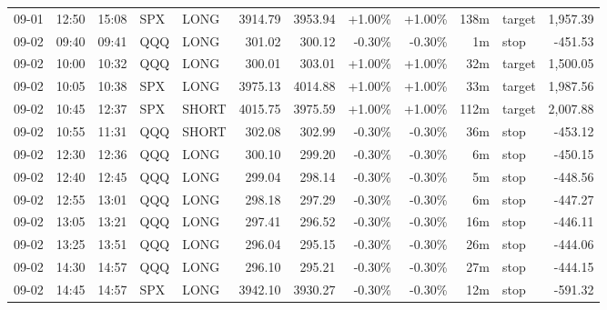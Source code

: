 \documentclass[11pt,a4paper]{article}
\begin{document}
\begin{center}
\begin{longtable}{>{\color{txtmain}}l l l l l r r r r r >{\color{txtmain}}l r}
09-01 & 12:50 & 15:08 & SPX & LONG & 3914.79 & 3953.94 & \textcolor{wingreen}{+1.00\%} & \textcolor{wingreen}{+1.00\%} & 138m & target & \textcolor{wingreen}{1,957.39} \\
09-02 & 09:40 & 09:41 & QQQ & LONG & 301.02 & 300.12 & \textcolor{lossred}{-0.30\%} & \textcolor{lossred}{-0.30\%} & 1m & stop & \textcolor{lossred}{-451.53} \\
09-02 & 10:00 & 10:32 & QQQ & LONG & 300.01 & 303.01 & \textcolor{wingreen}{+1.00\%} & \textcolor{wingreen}{+1.00\%} & 32m & target & \textcolor{wingreen}{1,500.05} \\
09-02 & 10:05 & 10:38 & SPX & LONG & 3975.13 & 4014.88 & \textcolor{wingreen}{+1.00\%} & \textcolor{wingreen}{+1.00\%} & 33m & target & \textcolor{wingreen}{1,987.56} \\
09-02 & 10:45 & 12:37 & SPX & SHORT & 4015.75 & 3975.59 & \textcolor{wingreen}{+1.00\%} & \textcolor{wingreen}{+1.00\%} & 112m & target & \textcolor{wingreen}{2,007.88} \\
09-02 & 10:55 & 11:31 & QQQ & SHORT & 302.08 & 302.99 & \textcolor{lossred}{-0.30\%} & \textcolor{lossred}{-0.30\%} & 36m & stop & \textcolor{lossred}{-453.12} \\
09-02 & 12:30 & 12:36 & QQQ & LONG & 300.10 & 299.20 & \textcolor{lossred}{-0.30\%} & \textcolor{lossred}{-0.30\%} & 6m & stop & \textcolor{lossred}{-450.15} \\
09-02 & 12:40 & 12:45 & QQQ & LONG & 299.04 & 298.14 & \textcolor{lossred}{-0.30\%} & \textcolor{lossred}{-0.30\%} & 5m & stop & \textcolor{lossred}{-448.56} \\
09-02 & 12:55 & 13:01 & QQQ & LONG & 298.18 & 297.29 & \textcolor{lossred}{-0.30\%} & \textcolor{lossred}{-0.30\%} & 6m & stop & \textcolor{lossred}{-447.27} \\
09-02 & 13:05 & 13:21 & QQQ & LONG & 297.41 & 296.52 & \textcolor{lossred}{-0.30\%} & \textcolor{lossred}{-0.30\%} & 16m & stop & \textcolor{lossred}{-446.11} \\
09-02 & 13:25 & 13:51 & QQQ & LONG & 296.04 & 295.15 & \textcolor{lossred}{-0.30\%} & \textcolor{lossred}{-0.30\%} & 26m & stop & \textcolor{lossred}{-444.06} \\
09-02 & 14:30 & 14:57 & QQQ & LONG & 296.10 & 295.21 & \textcolor{lossred}{-0.30\%} & \textcolor{lossred}{-0.30\%} & 27m & stop & \textcolor{lossred}{-444.15} \\
09-02 & 14:45 & 14:57 & SPX & LONG & 3942.10 & 3930.27 & \textcolor{lossred}{-0.30\%} & \textcolor{lossred}{-0.30\%} & 12m & stop & \textcolor{lossred}{-591.32} \\

\end{longtable}
\end{center}
\end{document}
